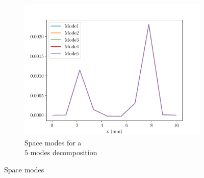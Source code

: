 \begin{figure}
\begin{subfigure}{0.3\linewidth}
        \centering
        \includegraphics[width=\linewidth]{Figures/Space_modes5.pdf}
        \caption{Space modes for a \\$5$ modes decomposition}
    \end{subfigure}
        \caption{Space modes}
    \label{fig:SpaceModeWeight}
\end{figure}

